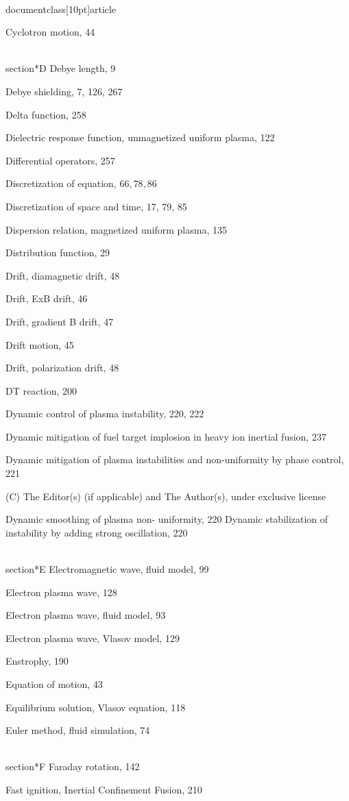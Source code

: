\\documentclass[10pt]{article}
\begin{document}
{{{{{{Cyclotron motion, 44

\\section*{D}
Debye length, 9

Debye shielding, 7, 126, 267

Delta function, 258

Dielectric response function, unmagnetized uniform plasma, 122

Differential operators, 257

Discretization of equation, $66,78,86$

Discretization of space and time, 17, 79, 85

Dispersion relation, magnetized uniform plasma, 135

Distribution function, 29

Drift, diamagnetic drift, 48

Drift, ExB drift, 46

Drift, gradient B drift, 47

Drift motion, 45

Drift, polarization drift, 48

DT reaction, 200

Dynamic control of plasma instability, 220, 222

Dynamic mitigation of fuel target implosion in heavy ion inertial fusion, 237

Dynamic mitigation of plasma instabilities and non-uniformity by phase control, 221

(C) The Editor(s) (if applicable) and The Author(s), under exclusive license

Dynamic smoothing of plasma non-
uniformity, 220
Dynamic stabilization of instability by
adding strong oscillation, 220

\\section*{E}
Electromagnetic wave, fluid model, 99

Electron plasma wave, 128

Electron plasma wave, fluid model, 93

Electron plasma wave, Vlasov model, 129

Enstrophy, 190

Equation of motion, 43

Equilibrium solution, Vlasov equation, 118

Euler method, fluid simulation, 74

\\section*{F}
Faraday rotation, 142

Fast ignition, Inertial Confinement Fusion, 210

}}}}}}
\end{document}
